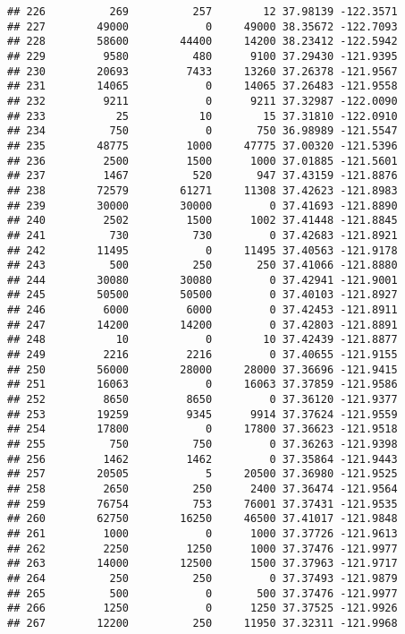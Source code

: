 \documentclass[
]{book}
\begin{document}
\begin{verbatim}
## 226          269          257        12 37.98139 -122.3571
## 227        49000            0     49000 38.35672 -122.7093
## 228        58600        44400     14200 38.23412 -122.5942
## 229         9580          480      9100 37.29430 -121.9395
## 230        20693         7433     13260 37.26378 -121.9567
## 231        14065            0     14065 37.26483 -121.9558
## 232         9211            0      9211 37.32987 -122.0090
## 233           25           10        15 37.31810 -122.0910
## 234          750            0       750 36.98989 -121.5547
## 235        48775         1000     47775 37.00320 -121.5396
## 236         2500         1500      1000 37.01885 -121.5601
## 237         1467          520       947 37.43159 -121.8876
## 238        72579        61271     11308 37.42623 -121.8983
## 239        30000        30000         0 37.41693 -121.8890
## 240         2502         1500      1002 37.41448 -121.8845
## 241          730          730         0 37.42683 -121.8921
## 242        11495            0     11495 37.40563 -121.9178
## 243          500          250       250 37.41066 -121.8880
## 244        30080        30080         0 37.42941 -121.9001
## 245        50500        50500         0 37.40103 -121.8927
## 246         6000         6000         0 37.42453 -121.8911
## 247        14200        14200         0 37.42803 -121.8891
## 248           10            0        10 37.42439 -121.8877
## 249         2216         2216         0 37.40655 -121.9155
## 250        56000        28000     28000 37.36696 -121.9415
## 251        16063            0     16063 37.37859 -121.9586
## 252         8650         8650         0 37.36120 -121.9377
## 253        19259         9345      9914 37.37624 -121.9559
## 254        17800            0     17800 37.36623 -121.9518
## 255          750          750         0 37.36263 -121.9398
## 256         1462         1462         0 37.35864 -121.9443
## 257        20505            5     20500 37.36980 -121.9525
## 258         2650          250      2400 37.36474 -121.9564
## 259        76754          753     76001 37.37431 -121.9535
## 260        62750        16250     46500 37.41017 -121.9848
## 261         1000            0      1000 37.37726 -121.9613
## 262         2250         1250      1000 37.37476 -121.9977
## 263        14000        12500      1500 37.37963 -121.9717
## 264          250          250         0 37.37493 -121.9879
## 265          500            0       500 37.37476 -121.9977
## 266         1250            0      1250 37.37525 -121.9926
## 267        12200          250     11950 37.32311 -121.9968

\end{verbatim}
\end{document}
